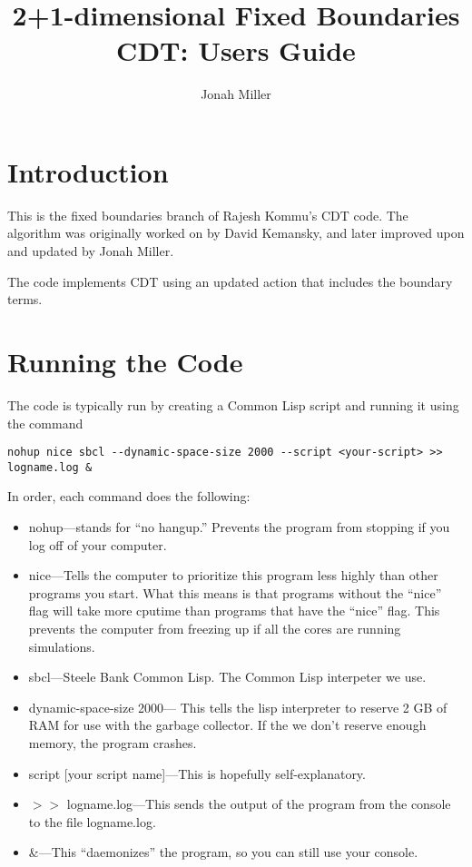 \message{ !name(users_guide.tex)}\documentclass{article}
\author{Jonah Miller}
\title{2+1-dimensional Fixed Boundaries CDT: Users Guide}
\begin{document}

\maketitle

\section{Introduction}

This is the fixed boundaries branch of Rajesh Kommu's CDT code. The
algorithm was originally worked on by David Kemansky, and later
improved upon and updated by Jonah Miller.

The code implements CDT using an updated action that includes the
boundary terms.

\section{Running the Code}

The code is typically run by creating a Common Lisp script and running
it using the command

\lstset{language=Bash,stepnumber=2}
\begin{lstlisting}
nohup nice sbcl --dynamic-space-size 2000 --script <your-script> >> logname.log &
\end{lstlisting}
In order, each command does the following:
\begin{itemize}
\item nohup---stands for ``no hangup.'' Prevents the program from
  stopping if you log off of your computer.
\item nice---Tells the computer to prioritize this program less highly
  than other programs you start. What this means is that programs
  without the ``nice'' flag will take more cputime than programs that
  have the ``nice'' flag. This prevents the computer from freezing up
  if all the cores are running simulations.
\item sbcl---Steele Bank Common Lisp. The Common Lisp interpeter we use.
\item dynamic-space-size 2000--- This tells the lisp interpreter to
  reserve 2 GB of RAM for use with the garbage collector. If the we
  don't reserve enough memory, the program crashes.
\item script [your script name]---This is hopefully self-explanatory.
\item $>>$ logname.log---This sends the
  output of the program from the console to the file logname.log.
\item \&---This ``daemonizes'' the program, so you can still use your console.
\end{itemize}
\end{document}
